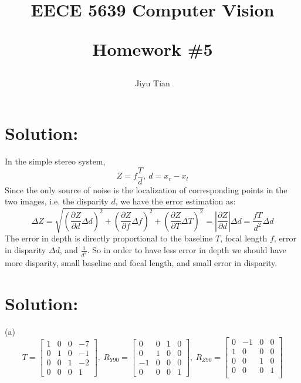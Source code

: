 \documentclass[12pt]{article}
\title{EECE 5639 Computer Vision\\ [2ex] \begin{large} Homework \#5 \end{large} }
\author{Jiyu Tian}
\date{}
\begin{document}
\maketitle
\pagestyle{empty}
\section{Solution:}
In the simple stereo system,
\begin{equation*}
    Z = f\frac{T}{d},\ d= x_r - x_l
\end{equation*}
Since the only source of noise is the localization of corresponding points in the two images, i.e. the disparity $d$, we have the error estimation as:
\begin{equation*}
    \Delta Z = \sqrt{\left( \frac{\partial Z}{\partial d}\Delta d\right)^2+ \left( \frac{\partial Z}{\partial f}\Delta f\right)^2 + \left( \frac{\partial Z}{\partial T}\Delta T\right)^2} = |\frac{\partial Z}{\partial d}|\Delta d = \frac{fT}{d^2}\Delta d
\end{equation*}
The error in depth is directly proportional to the baseline $T$, focal length $f$, error in disparity $\Delta d$, and $\frac{1}{d^2}$. So in order to have less error in depth we should have more disparity, small baseline and focal length, and small error in disparity.

\section{Solution:}
(a) 
\begin{equation*}
T = \left[ \begin{array}{cccc}
1 & 0 & 0 & -7\\
0 & 1 & 0 & -1\\
0 & 0 & 1 & -2\\
0 & 0 & 0 & 1
\end{array} \right],\ R_{Y90}  = \left[ \begin{array}{cccc}
0 & 0 & 1 & 0\\
0 & 1 & 0 & 0\\
-1 & 0 & 0 & 0\\
0 & 0 & 0 & 1
\end{array} \right],\ R_{Z90}  = \left[ \begin{array}{cccc}
0 & -1 & 0 & 0\\
1 & 0 & 0 & 0\\
0 & 0 & 1 & 0\\
0 & 0 & 0 & 1\\
\end{array} \right]
\end{equation*}
\end{document}
